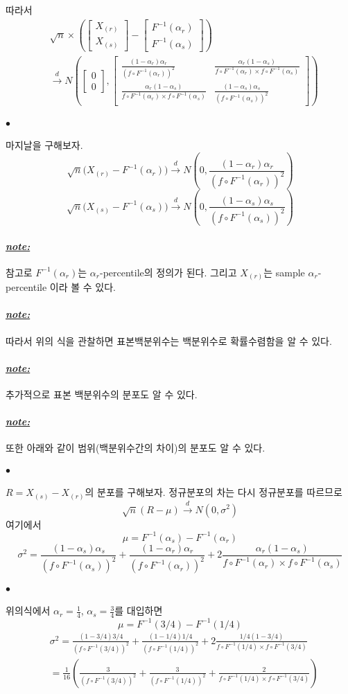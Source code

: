\documentclass[12pt,oneside,english]{book}
\def\ck{\paragraph{\Large$\bullet$}\Large}
\def\note{\paragraph{\Large\textit{\underline{note:}}}\Large}
\begin{document}
따라서 
\begin{align*}
& \sqrt{n}\times\left(\begin{bmatrix}X_{(r)} \\ X_{(s)}\end{bmatrix}-\begin{bmatrix} F^{-1}(\alpha_r) \\ F^{-1}(\alpha_s) \end{bmatrix}\right) \\
& \overset{d}{\to} 
N\left(\begin{bmatrix} 0 \\ 0 \end{bmatrix},\begin{bmatrix}
\frac{(1-\alpha_r)\alpha_r}{(f\circ F^{-1}(\alpha_r))^2} & \frac{\alpha_r(1-\alpha_s)}{f\circ F^{-1}(\alpha_r) \times f\circ F^{-1}(\alpha_s)} \\ 
\frac{\alpha_r(1-\alpha_s)}{f\circ F^{-1}(\alpha_r) \times f\circ F^{-1}(\alpha_s)} & 
\frac{(1-\alpha_s)\alpha_s}{(f\circ F^{-1}(\alpha_s))^2} 
\end{bmatrix}\right)
\end{align*}

\ck 마지날을 구해보자. 
\[
\sqrt{n}\big(X_{(r)}-F^{-1}(\alpha_r)\big) \overset{d}{\to} N\left(0, \frac{(1-\alpha_r)\alpha_r}{(f\circ F^{-1}(\alpha_r))^2} \right)
\]
\[
\sqrt{n}\big(X_{(s)}-F^{-1}(\alpha_s)\big) \overset{d}{\to} N\left(0, \frac{(1-\alpha_s)\alpha_s}{(f\circ F^{-1}(\alpha_s))^2} \right)
\]

\note 참고로 $F^{-1}(\alpha_r)$는 $\alpha_r$-percentile의 정의가 된다. 그리고 $X_{(r)}$는 sample $\alpha_r$-percentile 이라 볼 수 있다. 

\note 따라서 위의 식을 관찰하면 표본백분위수는 백분위수로 확률수렴함을 알 수 있다. 

\note 추가적으로 표본 백분위수의 분포도 알 수 있다. 

\note 또한 아래와 같이 범위(백분위수간의 차이)의 분포도 알 수 있다. 

\ck $R=X_{(s)}-X_{(r)}$의 분포를 구해보자. 정규분포의 차는 다시 정규분포를 따르므로 
\[
\sqrt{n}(R-\mu) \overset{d}{\to} N(0,\sigma^2)
\]
여기에서 
\[
\mu=F^{-1}(\alpha_s)-F^{-1}(\alpha_r)
\]
\[
\sigma^2=\frac{(1-\alpha_s)\alpha_s}{(f\circ F^{-1}(\alpha_s))^2}+\frac{(1-\alpha_r)\alpha_r}{(f\circ F^{-1}(\alpha_r))^2}+2 \frac{\alpha_r(1-\alpha_s)}{f\circ F^{-1}(\alpha_r) \times f\circ F^{-1}(\alpha_s)}
\]

\ck 위의식에서 $\alpha_r=\frac{1}{4}$, $\alpha_s=\frac{3}{4}$를 대입하면 
\[
\mu=F^{-1}(3/4)-F^{-1}(1/4)
\]
\begin{align*}
&\sigma^2=\frac{(1-3/4)3/4}{(f\circ F^{-1}(3/4))^2}+\frac{(1-1/4)1/4}{(f\circ F^{-1}(1/4))^2}+2 \frac{1/4(1-3/4)}{f\circ F^{-1}(1/4) \times f\circ F^{-1}(3/4)}\\
&=\frac{1}{16}\left(\frac{3}{(f\circ F^{-1}(3/4))^2}+\frac{3}{(f\circ F^{-1}(1/4))^2}+ \frac{2}{f\circ F^{-1}(1/4) \times f\circ F^{-1}(3/4)}\right)
\end{align*}
\end{document}
